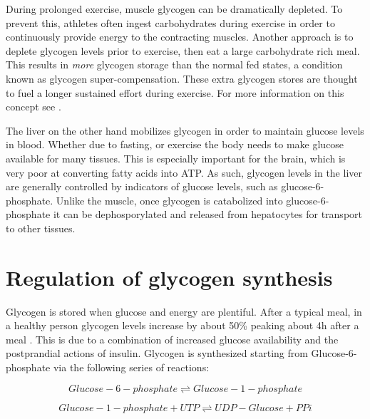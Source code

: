 \documentclass{tufte-handout}
\begin{document}
  During prolonged exercise, muscle glycogen can be dramatically depleted.  To prevent this, athletes often ingest carbohydrates during exercise in order to continuously provide energy to the contracting muscles.  Another approach is to deplete glycogen levels prior to exercise, then eat a large carbohydrate rich meal.  This results in \emph{more} glycogen storage than the normal fed states, a condition known as glycogen super-compensation.  These extra glycogen stores are thought to fuel a longer sustained effort during exercise.  For more information on this concept see \citet{Hawley1997}.  

  The liver on the other hand mobilizes glycogen in order to maintain glucose levels in blood.  Whether due to fasting, or exercise the body needs to make glucose available for many tissues.  This is especially important for the brain, which is very poor at converting fatty acids into ATP.  As such, glycogen levels in the liver are generally controlled by indicators of glucose levels, such as glucose-6-phosphate.  Unlike the muscle, once glycogen is catabolized into glucose-6-phosphate it can be dephosporylated and released from hepatocytes for transport to other tissues.

\section{Regulation of glycogen synthesis}

Glycogen is stored when glucose and energy are plentiful.  After a typical meal, in a healthy person glycogen levels increase by about 50\% peaking about 4h after a meal \citep{Taylor1996a}.  This is due to a combination of increased glucose availability and the postprandial actions of insulin.  Glycogen is synthesized starting from Glucose-6-phosphate via the following series of reactions:

\begin{equation}
Glucose-6-phosphate \rightleftharpoons Glucose-1-phosphate
\end{equation}

\begin{equation}
Glucose-1-phosphate + UTP \rightleftharpoons UDP-Glucose + PPi
\end{equation}
\end{document}

